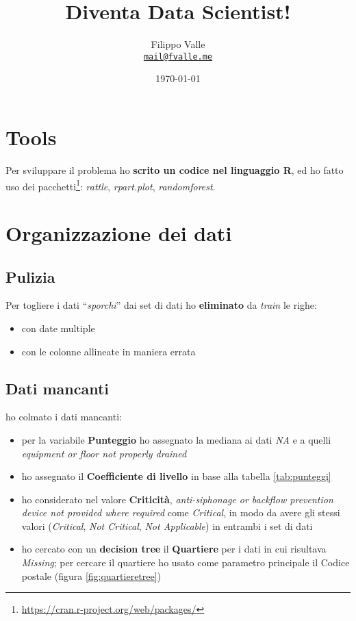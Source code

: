 \documentclass[10pt]{article}
\title{\small{Diventa Data Scientist!}}
\author{\small{Filippo Valle}\\ \texttt{\href{mailto:mail@fvalle.me?Subject=Diventa\%20Data\%20Scientist}{mail@fvalle.me}}}
\date{\small{\today}}
\begin{document}
\maketitle
\section{Tools}
\label{sec:tools}
Per sviluppare il problema ho \textbf{scrito un codice nel linguaggio R}, ed ho fatto uso dei pacchetti\footnote{\url{https://cran.r-project.org/web/packages/}}: \emph{rattle}, \emph{rpart.plot}, \emph{randomforest}.

\section{Organizzazione dei dati}
\subsection{Pulizia}
\label{sec:pulizia}
Per togliere i dati ``\emph{sporchi}'' dai set di dati ho  \textbf{eliminato} da \emph{train} le righe:
\begin{itemize}
\item con date multiple
\item con le colonne allineate in maniera errata  
\end{itemize}

\subsection{Dati mancanti}
\label{sec:datimancanti}
ho colmato i dati mancanti:
\begin{itemize}
\item per la variabile \textbf{Punteggio} ho assegnato la mediana ai dati \emph{NA} e a quelli \emph{equipment or floor not properly drained} 
\item ho assegnato il \textbf{Coefficiente di livello} in base alla tabella \ref{tab:punteggi}
\item ho considerato nel valore \textbf{Criticità}, \emph{anti-siphonage or backflow prevention device not provided where required} come \emph{Critical}, in modo da avere gli stessi valori (\emph{Critical}, \emph{Not Critical}, \emph{Not Applicable})  in entrambi i set di dati
\item ho cercato con un \textbf{decision tree} il \textbf{Quartiere} per i dati in cui risultava \emph{Missing}; per cercare il quartiere ho usato come parametro principale il Codice postale (figura \ref{fig:quartieretree})
\end{itemize}
\end{document}
